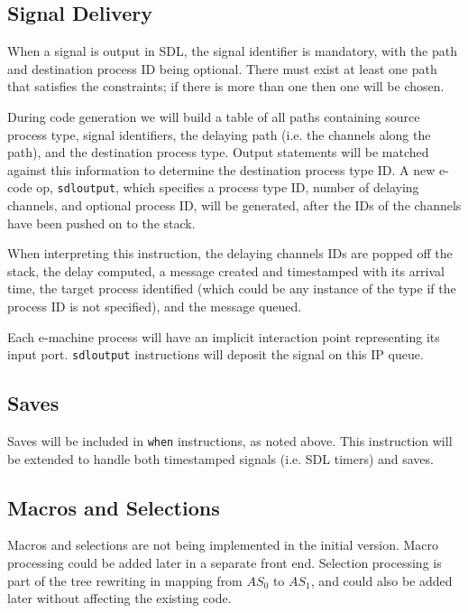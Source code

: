 \subsection{Signal Delivery}
\label{deliver}

When a signal is output in SDL, the signal identifier is mandatory,
with the path and destination process ID being optional. There
must exist at least one path that satisfies the constraints; if
there is more than one then one will be chosen.

During code generation we will build a table of all paths 
containing source process type, signal identifiers, the
delaying path (i.e. the channels along the path), and the
destination process type. 
Output statements will be matched against this information
to determine the destination process type ID.
A new e-code op, {\tt sdloutput}, which specifies a process type ID,
number of delaying channels, and optional process ID, will be 
generated, after the IDs of the channels have been pushed on
to the stack.

When interpreting this instruction, the delaying
channels IDs are popped off the stack, the delay computed, 
a message created and timestamped with its arrival time,
the target process identified (which could be any instance
of the type if the process ID is not specified), and the message
queued.

Each e-machine process will have an implicit interaction point
representing its input port. {\tt sdloutput} instructions will
deposit the signal on this IP queue.

\subsection{Saves}

Saves will be included in {\tt when} instructions, as noted
above.
This instruction will be extended to handle both timestamped
signals (i.e. SDL timers) and saves.

\subsection{Macros and Selections}

Macros and selections are not being implemented in the initial
version. 
Macro processing could be added later in a separate
front end. 
Selection processing is part of the tree rewriting
in mapping from $AS_0$ to $AS_1$, and could also be added
later without affecting the existing code.

